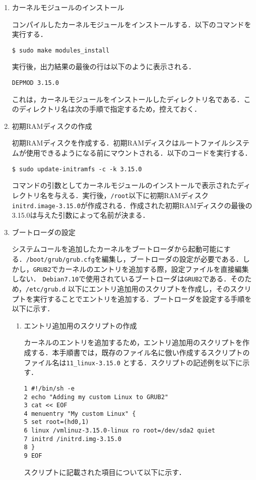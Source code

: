 \documentclass[12pt]{jsarticle}
\begin{document}
\begin{enumerate}
\item カーネルモジュールのインストール

コンパイルしたカーネルモジュールをインストールする．以下のコマンドを実行する．
\begin{verbatim}
$ sudo make modules_install
\end{verbatim}
実行後，出力結果の最後の行は以下のように表示される．
\begin{verbatim}
DEPMOD 3.15.0
\end{verbatim}
これは，カーネルモジュールをインストールしたディレクトリ名である．このディレクトリ名は次の手順で指定するため，控えておく．

\item 初期RAMディスクの作成

初期RAMディスクを作成する．初期RAMディスクはルートファイルシステムが使用できるようになる前にマウントされる．以下のコードを実行する．
\begin{verbatim}
$ sudo update-initramfs -c -k 3.15.0
\end{verbatim}
コマンドの引数としてカーネルモジュールのインストールで表示されたディレクトリ名を与える．実行後，\verb|/root|以下に初期RAMディスク\verb|initrd.image-3.15.0|が作成される．作成された初期RAMディスクの最後の3.15.0は与えた引数によって名前が決まる．

\item ブートローダの設定

システムコールを追加したカーネルをブートローダから起動可能にする．\verb|/boot/grub/grub.cfg|を編集し，ブートローダの設定が必要である．しかし，\verb|GRUB2|でカーネルのエントリを追加する際，設定ファイルを直接編集しない．
\verb|Debian7.10|で使用されているブートローダは\verb|GRUB2|である．そのため，\verb|/etc/grub.d| 以下にエントリ追加用のスクリプトを作成し，そのスクリプトを実行することでエントリを追加する．ブートローダを設定する手順を以下に示す．

\begin{enumerate}
\item エントリ追加用のスクリプトの作成

カーネルのエントリを追加するため，エントリ追加用のスクリプトを作成する．本手順書では，既存のファイル名に倣い作成するスクリプトのファイル名は\verb|11_linux-3.15.0| とする．スクリプトの記述例を以下に示す．
\begin{verbatim}
1 #!/bin/sh -e
2 echo "Adding my custom Linux to GRUB2"
3 cat << EOF
4 menuentry "My custom Linux" {
5 set root=(hd0,1)
6 linux /vmlinuz-3.15.0-linux ro root=/dev/sda2 quiet
7 initrd /initrd.img-3.15.0
8 }
9 EOF
\end{verbatim}
スクリプトに記載された項目について以下に示す．


\end{enumerate}
\end{enumerate}
\end{document}
